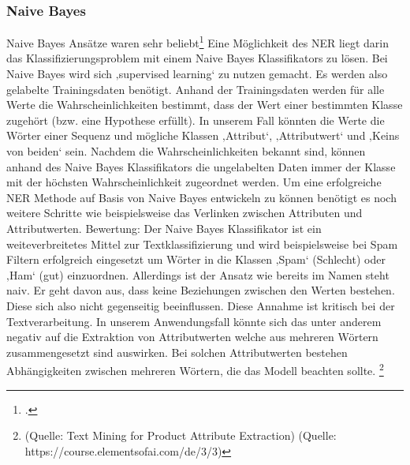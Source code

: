 \documentclass[paper=a4,12pt,listof=totoc]{scrartcl}%
\begin{document}
	\subsubsection{Naive Bayes}
	Naive Bayes Ansätze waren sehr beliebt\footcite{Ghani.2006}
	Eine Möglichkeit des NER liegt darin das Klassifizierungsproblem mit einem Naive Bayes Klassifikators zu lösen. Bei Naive Bayes wird sich ‚supervised learning‘ zu nutzen gemacht. Es werden also gelabelte Trainingsdaten benötigt. Anhand der Trainingsdaten werden für alle Werte die Wahrscheinlichkeiten bestimmt, dass der Wert einer bestimmten Klasse zugehört (bzw. eine Hypothese erfüllt). In unserem Fall könnten die Werte die Wörter einer Sequenz und mögliche Klassen ‚Attribut‘, ‚Attributwert‘ und ‚Keins von beiden‘ sein. Nachdem die Wahrscheinlichkeiten bekannt sind, können anhand des Naive Bayes Klassifikators die ungelabelten Daten immer der Klasse mit der höchsten Wahrscheinlichkeit zugeordnet werden. Um eine erfolgreiche NER Methode auf Basis von Naive Bayes entwickeln zu können benötigt es noch weitere Schritte wie beispielsweise das Verlinken zwischen Attributen und Attributwerten. 
	Bewertung: Der Naive Bayes Klassifikator ist ein weiteverbreitetes Mittel zur Textklassifizierung und wird beispielsweise bei Spam Filtern erfolgreich eingesetzt um Wörter in die Klassen ‚Spam‘ (Schlecht) oder ‚Ham‘ (gut) einzuordnen. Allerdings ist der Ansatz wie bereits im Namen steht naiv. Er geht davon aus, dass keine Beziehungen zwischen den Werten bestehen. Diese sich also nicht gegenseitig beeinflussen. Diese Annahme ist kritisch bei der Textverarbeitung. In unserem Anwendungsfall könnte sich das unter anderem negativ auf die Extraktion von Attributwerten welche aus mehreren Wörtern zusammengesetzt sind auswirken. Bei solchen Attributwerten bestehen Abhängigkeiten zwischen mehreren Wörtern, die das Modell beachten sollte.
	\footnote{(Quelle: Text Mining for Product Attribute Extraction)
	(Quelle: https://course.elementsofai.com/de/3/3)}
\end{document}
